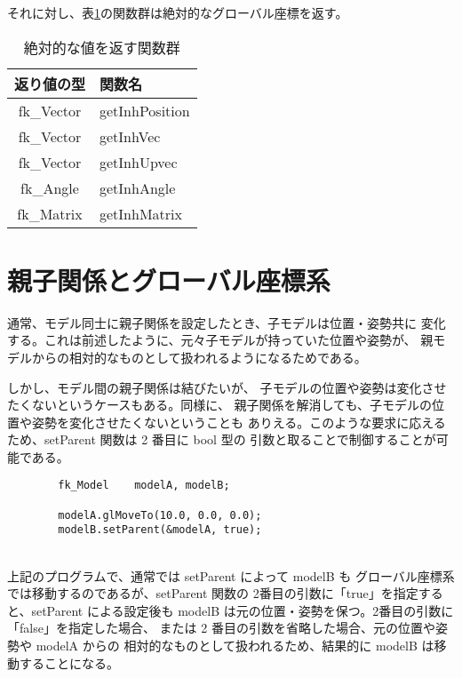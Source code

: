 それに対し、表\ref{tbl:fkInh2}の関数群は絶対的なグローバル座標を返す。

\begin{table}[H]
\caption{絶対的な値を返す関数群}
\label{tbl:fkInh2}
\begin{center}
\begin{tabular}{|c|l|}
\hline
返り値の型 & 関数名 \\ \hline \hline
fk\_Vector & getInhPosition \\ \hline
fk\_Vector & getInhVec \\ \hline
fk\_Vector & getInhUpvec \\ \hline
fk\_Angle & getInhAngle \\ \hline
fk\_Matrix & getInhMatrix \\ \hline
\end{tabular}
\end{center}
\end{table}


\section{親子関係とグローバル座標系} \label{sec:modelglobal}
通常、モデル同士に親子関係を設定したとき、子モデルは位置・姿勢共に
変化する。これは前述したように、元々子モデルが持っていた位置や姿勢が、
親モデルからの相対的なものとして扱われるようになるためである。

しかし、モデル間の親子関係は結びたいが、
子モデルの位置や姿勢は変化させたくないというケースもある。同様に、
親子関係を解消しても、子モデルの位置や姿勢を変化させたくないということも
ありえる。このような要求に応えるため、setParent 関数は 2 番目に bool 型の
引数と取ることで制御することが可能である。
\\
\begin{breakbox}
\begin{verbatim}
        fk_Model    modelA, modelB;

        modelA.glMoveTo(10.0, 0.0, 0.0);
        modelB.setParent(&modelA, true);
\end{verbatim}
\end{breakbox}
~ \\
上記のプログラムで、通常では setParent によって modelB も
グローバル座標系では移動するのであるが、setParent 関数の
2番目の引数に「true」を指定すると、setParent による設定後も
modelB は元の位置・姿勢を保つ。2番目の引数に「false」を指定した場合、
または 2 番目の引数を省略した場合、元の位置や姿勢や modelA からの
相対的なものとして扱われるため、結果的に modelB は移動することになる。

